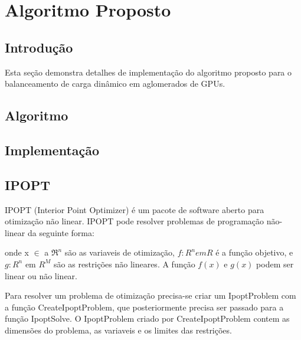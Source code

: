 \pagestyle{empty}
\cleardoublepage
\pagestyle{fancy}

\chapter{Algoritmo Proposto}\label{cap4}

\section{Introdução}\label{cap4:intro}

Esta seção demonstra detalhes de implementação do algoritmo proposto para o balanceamento de carga dinâmico em aglomerados de GPUs.


\section{Algoritmo}\label{cap4:Algoritmo}

\section{Implementação}\label{cap4:Implementacao}


\section{IPOPT}\label{cap4:ipopt}

IPOPT (Interior Point Optimizer) é um pacote de software aberto para otimização não linear. IPOPT pode resolver problemas de programação não-linear da seguinte forma:
	


onde x $\in$ a $\Re ^ n$ são as variaveis de otimização, $f : R^n em R$ é a função objetivo, e $g: R^n$ em $R^M$ são as restrições não lineares. A função $f(x)$ e $g(x)$ podem ser linear ou não linear.  

Para resolver um problema de otimização precisa-se criar um IpoptProblem com a função CreateIpoptProblem, que posteriormente precisa ser passado para a função IpoptSolve. O IpoptProblem criado por CreateIpoptProblem contem as dimensões do problema, as variaveis e os limites das restrições.








